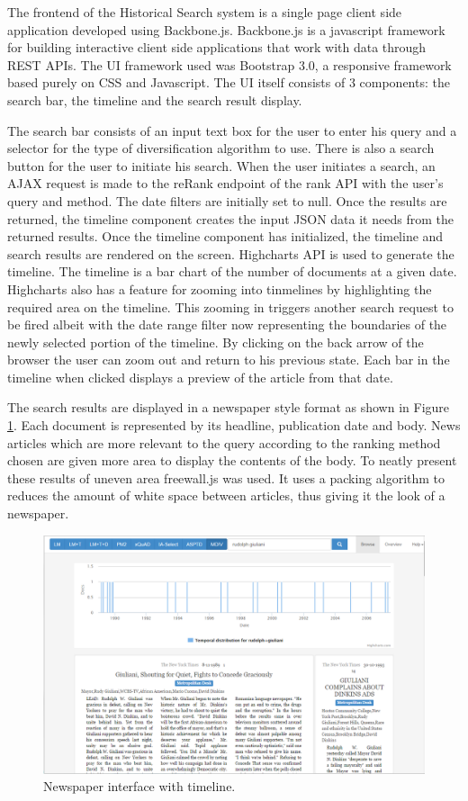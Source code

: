 The frontend of the Historical Search system is a single page client side application developed using Backbone.js. Backbone.js is a javascript framework for building interactive client side applications that work with data through REST APIs. The UI framework used was Bootstrap 3.0, a responsive framework based purely on CSS and Javascript. The UI itself consists of 3 components: the search bar, the timeline and the search result display. 

The search bar consists of an input text box for the user to enter his query and a selector for the type of diversification algorithm to use. There is also a search button for the user to initiate his search. When the user initiates a search, an AJAX request is made to the reRank endpoint of the rank API with the user's query and method. The date filters are initially set to null. Once the results are returned, the timeline component creates the input JSON data it needs from the returned results. Once the timeline component has initialized, the timeline and search results are rendered on the screen. Highcharts API is used to generate the timeline. The timeline is a bar chart of the number of documents at a given date. Highcharts also has a feature for zooming into tinmelines by highlighting the required area on the timeline. This zooming in triggers another search request to be fired albeit with the date range filter now representing the boundaries of the newly selected portion of the timeline. By clicking on the back arrow of the browser the user can zoom out and return to his previous state. Each bar in the timeline when clicked displays a preview of the article from that date. 

The search results are displayed in a newspaper style format as shown in Figure \ref{fig:ui}. Each document is represented by its headline, publication date and body. News articles which are more relevant to the query according to the ranking method chosen are given more area to display the contents of the body. To neatly present these results of uneven area freewall.js was used. It uses a packing algorithm to reduces the amount of white space between articles, thus giving it the look of a newspaper. 

\begin{figure}[!h]
\centering
\includegraphics[width=0.9\columnwidth]{images/ui.png}
\caption{Newspaper interface with timeline.}
\label{fig:ui}
\end{figure}

